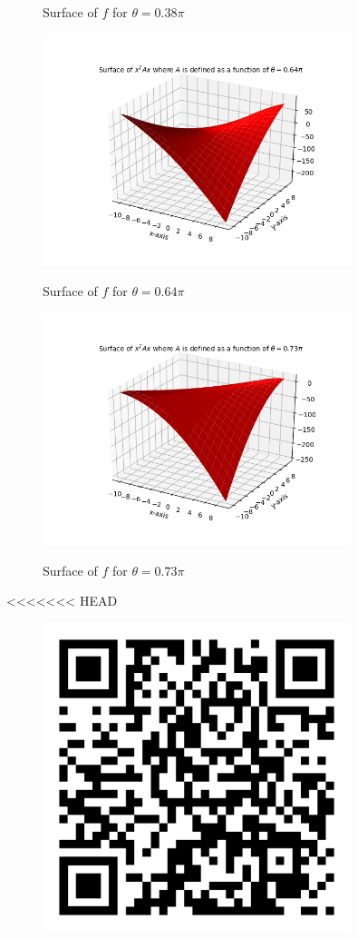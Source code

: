 \documentclass{article}
\begin{document}
\begin{flushleft}
\begin{figure}[htp]
\begin{figure}[htp]
        \caption{Surface of $f$ for $\theta=0.38\pi$}
\end{figure}
\begin{figure}[htp]
        \centering
        \includegraphics[width=9cm]{64pi.png}\\
        \caption{Surface of $f$ for $\theta=0.64\pi$}
\end{figure}
\begin{figure}[htp]
        \centering
        \includegraphics[width=9cm]{73pi.png}\\
        \caption{Surface of $f$ for $\theta=0.73\pi$}
\end{figure}
<<<<<<< HEAD
\clearpage
\begin{figure}[htp]
        \centering
        \includegraphics[width=9cm]{qr-code.png}\\

\end{figure}
\end{figure}
\end{flushleft}
\end{document}
